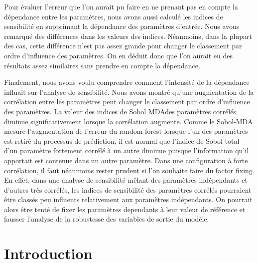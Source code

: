 \documentclass[
]{article}
\begin{document}
Pour évaluer l'erreur que l'on aurait pu faire en ne prenant pas en
compte la dépendance entre les paramètres, nous avons aussi calculé les
indices de sensibilité en supprimant la dépendance des paramètres
d'entrée. Nous avons remarqué des différences dans les valeurs des
indices. Néanmoins, dans la plupart des cas, cette différence n'est pas
assez grande pour changer le classement par ordre d'influence des
paramètres. On en déduit donc que l'on aurait eu des résultats assez
similaires sans prendre en compte la dépendance.

Finalement, nous avons voulu comprendre comment l'intensité de la
dépendance influait sur l'analyse de sensibilité. Nous avons montré
qu'une augmentation de la corrélation entre les paramètres peut changer
le classement par ordre d'influence des paramètres. La valeur des
indices de Sobol MDAdes paramètres corrélés diminue significativement
lorsque la corrélation augmente. Comme le Sobol-MDA mesure
l'augmentation de l'erreur du random forest lorsque l'un des paramètres
est retiré du processus de prédiction, il est normal que l'indice de
Sobol total d'un paramètre fortement corrélé à un autre diminue puisque
l'information qu'il apportait est contenue dans un autre paramètre. Dans
une configuration à forte corrélation, il faut néanmoins rester prudent
si l'on souhaite faire du factor fixing. En effet, dans une analyse de
sensibilité mêlant des paramètres indépendants et d'autres très
corrélés, les indices de sensibilité des paramètres corrélés pourraient
être classés peu influents relativement aux paramètres indépendants. On
pourrait alors être tenté de fixer les paramètres dependants à leur
valeur de référence et fausser l'analyse de la robustesse des variables
de sortie du modèle.

\hypertarget{introduction}{%
\section{Introduction}\label{introduction}}
\end{document}
